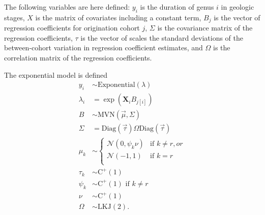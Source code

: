 \documentclass{article}
\begin{document}
The following variables are here defined: \(y_{i}\) is the duration of genus \(i\) in geologic stages, \(X\) is the matrix of covariates including a constant term, \(B_{j}\) is the vector of regression coefficients for origination cohort \(j\), \(\Sigma\) is the covariance matrix of the regression coefficients, \(\tau\) is the vector of scales the standard deviations of the between-cohort variation in regression coefficient estimates, and \(\Omega\) is the correlation matrix of the regression coefficients.

The exponential model is defined
\begin{equation}
  \begin{aligned}
    y_{i} &\sim \mathrm{Exponential}(\lambda) \\
    \lambda_{i} &= \exp(\mathbf{X}_{i} B_{j[i]}) \\
    B &\sim \mathrm{MVN}(\vec{\mu}, \Sigma) \\
    \Sigma &= \text{Diag}(\vec{\tau}) \Omega \text{Diag}(\vec{\tau}) \\
    \mu_{k} &\sim 
    \begin{cases} 
      \mathcal{N}(0, \psi_{k} \nu) & \text{if } k \neq r, or \\
      \mathcal{N}(-1, 1) & \text{if } k = r \\
    \end{cases} \\
    \tau_{k} &\sim \mathrm{C^{+}}(1) \\
    \psi_{k} &\sim \mathrm{C^{+}}(1) \text{ if } k \neq r \\
    \nu &\sim \mathrm{C^{+}}(1) \\
    \Omega &\sim \text{LKJ}(2).
  \end{aligned}
  \label{eq:exp_total}
\end{equation}
\end{document}
